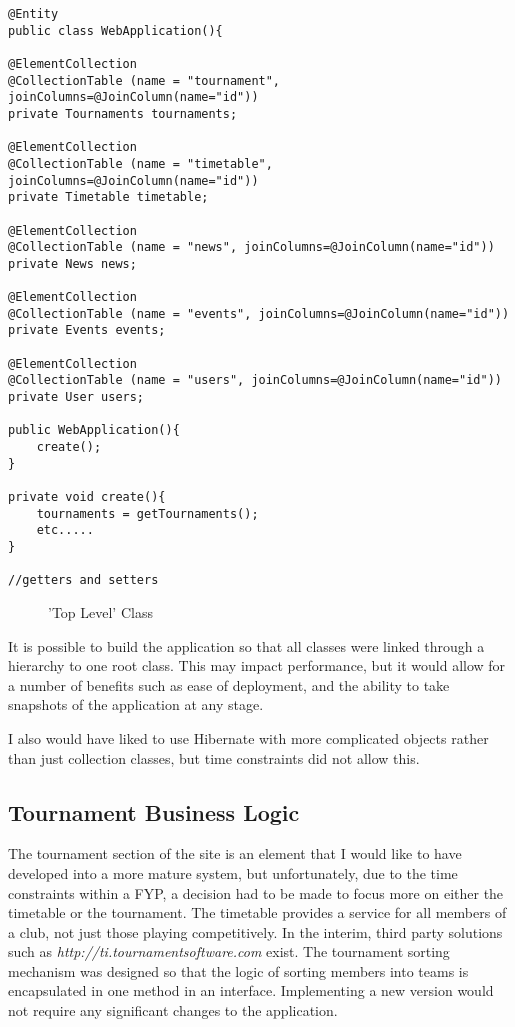 \begin{lstlisting}
@Entity
public class WebApplication(){

@ElementCollection
@CollectionTable (name = "tournament", joinColumns=@JoinColumn(name="id"))
private Tournaments tournaments;

@ElementCollection
@CollectionTable (name = "timetable", joinColumns=@JoinColumn(name="id"))
private Timetable timetable;

@ElementCollection
@CollectionTable (name = "news", joinColumns=@JoinColumn(name="id"))
private News news;

@ElementCollection
@CollectionTable (name = "events", joinColumns=@JoinColumn(name="id"))
private Events events;

@ElementCollection
@CollectionTable (name = "users", joinColumns=@JoinColumn(name="id"))
private User users;

public WebApplication(){
	create();
}

private void create(){
	tournaments = getTournaments();
	etc.....
}

//getters and setters

\end{lstlisting}
\begin{figure}[H]
\caption{'Top Level' Class}
\label{fig:toplevel}
\end{figure}

It is possible to build the application so that all classes were linked through a hierarchy to one root class. This may impact performance, but it would allow for a number of benefits such as ease of deployment, and the ability to take snapshots of the application at any stage.

I also would have liked to use Hibernate with more complicated objects rather than just collection classes, but time constraints did not allow this.

\subsection{Tournament Business Logic}

The tournament section of the site is an element that I would like to have developed into a more mature system, but unfortunately, due to the time constraints within a FYP, a decision had to be made to focus more on either the timetable or the tournament. The timetable provides a service for all members of a club, not just those playing competitively. In the interim, third party solutions such as \textit{http://ti.tournamentsoftware.com} exist. The tournament sorting mechanism was designed so that the logic of sorting members into teams is encapsulated in one method in an interface. Implementing a new version would not require any significant changes to the application. 

